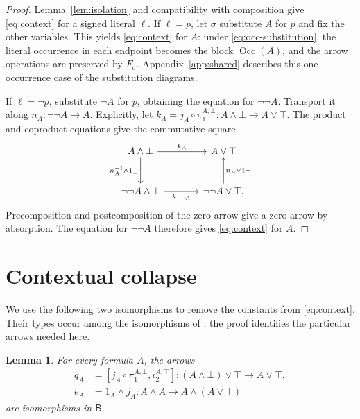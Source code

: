 \documentclass[11pt]{article}
\newtheorem{lemma}[theorem]{Lemma}
\newcommand{\B}{\mathsf B}
\newcommand{\Occ}{\operatorname{Occ}}
\begin{document}
\begin{proof}
Lemma~\ref{lem:isolation} and compatibility with composition give
\eqref{eq:context} for a signed literal $\ell$.
If $\ell=p$, let $\sigma$ substitute $A$ for $p$ and fix the other variables.
This yields \eqref{eq:context} for $A$: under
\eqref{eq:occ-substitution}, the literal occurrence in each endpoint
becomes the block $\Occ(A)$, and the arrow operations are preserved
by $F_\sigma$. Appendix~\ref{app:shared} describes this
one-occurrence case of the substitution diagrams.

If $\ell=\neg p$, substitute $\neg A$ for $p$, obtaining the equation
for $\neg\neg A$. Transport it along $n_A:\neg\neg A\to A$.
Explicitly, let
$k_A=j_A\circ\pi_1^{A,\bot}:A\wedge\bot\to A\vee\top$.
The product and coproduct equations give the commutative square
\[
\begin{tikzcd}[column sep=large,row sep=large]
 A\wedge\bot\arrow[r,"k_A"]\arrow[d,"n_A^{-1}\wedge1_\bot"']
   &A\vee\top\\
 \neg\neg A\wedge\bot\arrow[r,"k_{\neg\neg A}"']
   &\neg\neg A\vee\top\arrow[u,"n_A\vee1_\top"'].
\end{tikzcd}
\]
Precomposition and postcomposition of the zero arrow give a zero
arrow by absorption. The equation for $\neg\neg A$ therefore gives
\eqref{eq:context} for $A$.
\end{proof}

\section{Contextual collapse}\label{sec:collapse}

We use the following two isomorphisms to remove the constants from
\eqref{eq:context}. Their types occur among the isomorphisms of
\cite[\S12.5, p.~294]{DP}; the proof identifies the particular arrows
needed here.

\begin{lemma}\label{lem:structural-isos}
For every formula $A$, the arrows
\[
 \begin{aligned}
 q_A&=[j_A\circ\pi_1^{A,\bot},\iota_2^{A,\top}]
      :(A\wedge\bot)\vee\top\longrightarrow A\vee\top,\\
 e_A&=1_A\wedge j_A
      :A\wedge A\longrightarrow A\wedge(A\vee\top)
 \end{aligned}
\]
are isomorphisms in $\B$.
\end{lemma}
\end{document}
